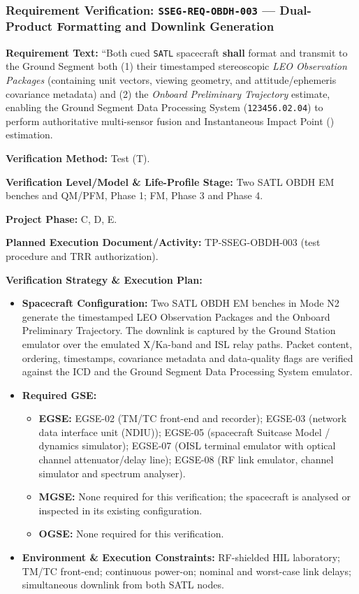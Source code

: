 \subsubsection{Requirement Verification: \texttt{SSEG-REQ-OBDH-003} --- Dual-Product Formatting and Downlink Generation}
\label{ver:SSEG-REQ-OBDH-003}
\textbf{Requirement Text:} ``Both cued \texttt{SATL} spacecraft \textbf{shall} format and transmit to the Ground Segment both (1) their timestamped stereoscopic \emph{LEO Observation Packages} (containing  unit vectors, viewing geometry, and attitude/ephemeris covariance metadata) and (2) the \emph{Onboard Preliminary Trajectory} estimate, enabling the Ground Segment Data Processing System (\texttt{123456.02.04}) to perform authoritative multi-sensor fusion and Instantaneous Impact Point () estimation.
\par\textbf{Verification Method:} Test (T).
\par\textbf{Verification Level/Model \& Life-Profile Stage:} Two SATL OBDH EM benches and QM/PFM, Phase 1; FM, Phase 3 and Phase 4.
\par\textbf{Project Phase:} C, D, E.
\par\textbf{Planned Execution Document/Activity:} TP-SSEG-OBDH-003 (test procedure and TRR authorization).
\par\textbf{Verification Strategy \& Execution Plan:}
\begin{itemize}
\item \textbf{Spacecraft Configuration:} Two SATL OBDH EM benches in Mode N2 generate the timestamped LEO Observation Packages and the Onboard Preliminary Trajectory. The downlink is captured by the Ground Station emulator over the emulated X/Ka-band and ISL relay paths. Packet content, ordering, timestamps, covariance metadata and data-quality flags are verified against the ICD and the Ground Segment Data Processing System emulator.
\item \textbf{Required GSE:}
\begin{itemize}
\item \textbf{EGSE:} EGSE-02 (TM/TC front-end and recorder); EGSE-03 (network data interface unit (NDIU)); EGSE-05 (spacecraft Suitcase Model / dynamics simulator); EGSE-07 (OISL terminal emulator with optical channel attenuator/delay line); EGSE-08 (RF link emulator, channel simulator and spectrum analyser).
\item \textbf{MGSE:} None required for this verification; the spacecraft is analysed or inspected in its existing configuration.
\item \textbf{OGSE:} None required for this verification.
\end{itemize}
\item \textbf{Environment \& Execution Constraints:} RF-shielded HIL laboratory; TM/TC front-end; continuous power-on; nominal and worst-case link delays; simultaneous downlink from both SATL nodes.
\end{itemize}
